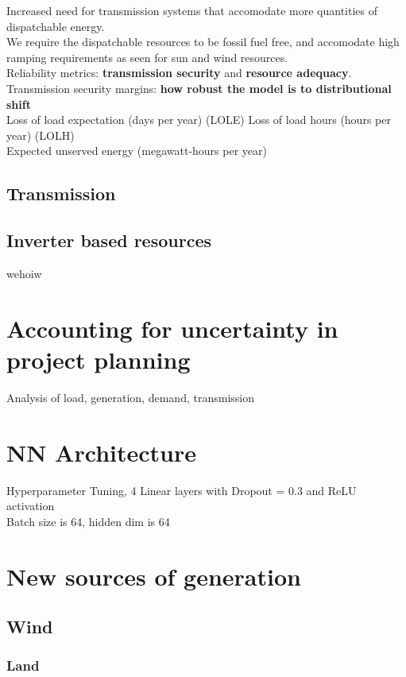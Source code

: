 \documentclass[plain]{article}
\newcommand{\1}{\mathbbm{1}}
\begin{document}
Increased need for transmission systems that accomodate more quantities of dispatchable energy.\\
We require the dispatchable resources to be fossil fuel free, and accomodate high ramping requirements as seen for sun and wind resources.\\
Reliability metrics: \textbf{transmission security} and \textbf{resource adequacy}.\\
Transmission security margins: \textbf{how robust the model is to distributional shift} \\
Loss of load expectation (days per year) (LOLE)
Loss of load hours (hours per year) (LOLH)\\
Expected unserved energy (megawatt-hours per year)\\

\subsection{Transmission}

\subsection{Inverter based resources}
wehoiw
\section{Accounting for uncertainty in project planning}

Analysis of load, generation, demand, transmission

\section{NN Architecture}
Hyperparameter Tuning, 4 Linear layers with Dropout = 0.3 and ReLU activation \\
Batch size is 64, hidden dim is 64
\section{New sources of generation}
\subsection{Wind}

\subsubsection{Land}
\end{document}
